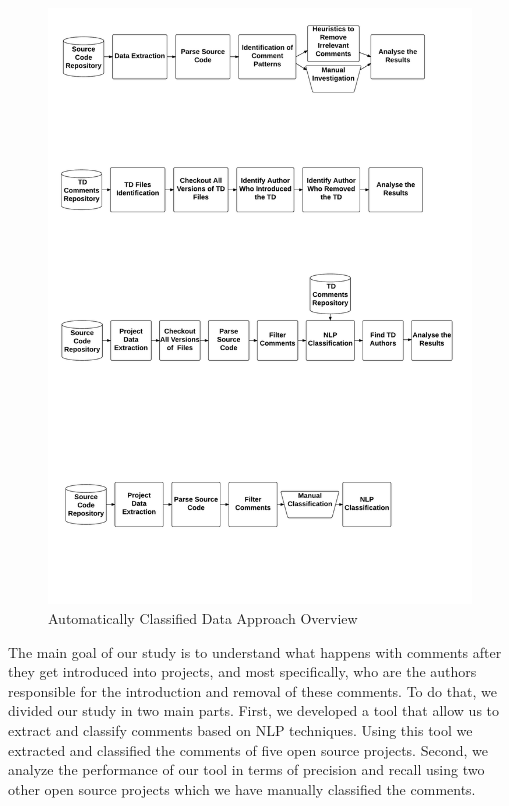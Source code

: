 
\begin{figure}[thb!]
  \centering
  \includegraphics[width=1\textwidth]{figures/automatically_classified_data_approach.pdf}
  \caption{Automatically Classified Data Approach Overview}
  \label{fig:automatically_classified_data_approach_overview}
\end{figure}

The main goal of our study is to understand what happens with \SATD comments after they get introduced into projects, and most specifically, who are the authors responsible for the introduction and removal of these comments. To do that, we divided our study in two main parts. First, we developed a tool that allow us to extract and classify \SATD comments based on NLP techniques. Using this tool we extracted and classified the comments of five open source projects. Second, we analyze the performance of our tool in terms of precision and recall using two other open source projects which we have manually classified the \SATD comments. 

